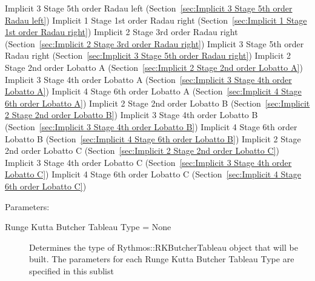 \begin{list}{}
      \newline 
    Implicit 3 Stage 5th order Radau left (Section~\ref{sec:Implicit 3 Stage 5th order Radau left})
      \newline 
    Implicit 1 Stage 1st order Radau right (Section~\ref{sec:Implicit 1 Stage 1st order Radau right})
      \newline 
    Implicit 2 Stage 3rd order Radau right (Section~\ref{sec:Implicit 2 Stage 3rd order Radau right})
      \newline 
    Implicit 3 Stage 5th order Radau right (Section~\ref{sec:Implicit 3 Stage 5th order Radau right})
      \newline 
    Implicit 2 Stage 2nd order Lobatto A (Section~\ref{sec:Implicit 2 Stage 2nd order Lobatto A})
      \newline 
    Implicit 3 Stage 4th order Lobatto A (Section~\ref{sec:Implicit 3 Stage 4th order Lobatto A})
      \newline 
    Implicit 4 Stage 6th order Lobatto A (Section~\ref{sec:Implicit 4 Stage 6th order Lobatto A})
      \newline 
    Implicit 2 Stage 2nd order Lobatto B (Section~\ref{sec:Implicit 2 Stage 2nd order Lobatto B})
      \newline 
    Implicit 3 Stage 4th order Lobatto B (Section~\ref{sec:Implicit 3 Stage 4th order Lobatto B})
      \newline 
    Implicit 4 Stage 6th order Lobatto B (Section~\ref{sec:Implicit 4 Stage 6th order Lobatto B})
      \newline 
    Implicit 2 Stage 2nd order Lobatto C (Section~\ref{sec:Implicit 2 Stage 2nd order Lobatto C})
      \newline 
    Implicit 3 Stage 4th order Lobatto C (Section~\ref{sec:Implicit 3 Stage 4th order Lobatto C})
      \newline 
    Implicit 4 Stage 6th order Lobatto C (Section~\ref{sec:Implicit 4 Stage 6th order Lobatto C})
  \item[Parameters:]
    \begin{description}
      \item[Runge Kutta Butcher Tableau Type = None] 
Determines the type of Rythmos::RKButcherTableau object that will be built.
The parameters for each Runge Kutta Butcher Tableau Type are specified in this sublist


\end{description}
\end{list}
